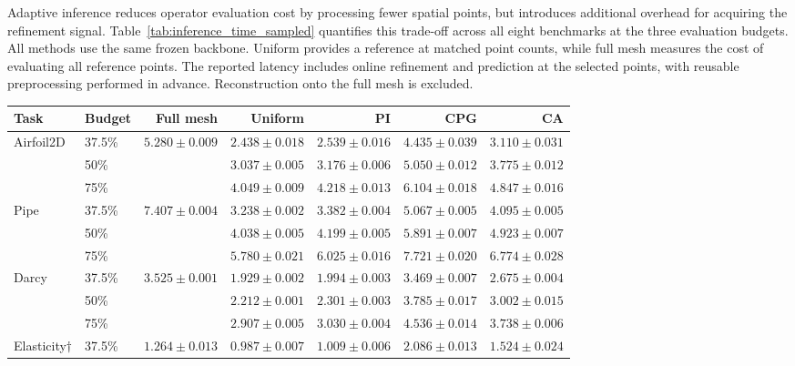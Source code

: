\documentclass{article}
\begin{document}
Adaptive inference reduces operator evaluation cost by processing fewer
spatial points, but introduces additional overhead for acquiring the
refinement signal. Table~\ref{tab:inference_time_sampled}
quantifies this trade-off across all eight benchmarks at the three
evaluation budgets. All methods use the same frozen backbone. Uniform
provides a reference at matched point counts, while full mesh measures the
cost of evaluating all reference points. The reported latency includes
online refinement and prediction at the selected points, with reusable
preprocessing performed in advance. Reconstruction onto the full mesh is
excluded.

\begin{table}[!ht]
\centering
\begingroup
\footnotesize
\setlength{\tabcolsep}{3.0pt}
\renewcommand{\arraystretch}{1.08}
\begin{tabular}{llrrrrr}
\toprule
Task & Budget & Full mesh & Uniform & PI & CPG & CA \\
\midrule
Airfoil2D & 37.5\% & $5.280\!\pm\!0.009$ & $2.438\!\pm\!0.018$ & $2.539\!\pm\!0.016$ & $4.435\!\pm\!0.039$ & $3.110\!\pm\!0.031$ \\
 & 50\% &  & $3.037\!\pm\!0.005$ & $3.176\!\pm\!0.006$ & $5.050\!\pm\!0.012$ & $3.775\!\pm\!0.012$ \\
 & 75\% &  & $4.049\!\pm\!0.009$ & $4.218\!\pm\!0.013$ & $6.104\!\pm\!0.018$ & $4.847\!\pm\!0.016$ \\
\addlinespace[2pt]
Pipe & 37.5\% & $7.407\!\pm\!0.004$ & $3.238\!\pm\!0.002$ & $3.382\!\pm\!0.004$ & $5.067\!\pm\!0.005$ & $4.095\!\pm\!0.005$ \\
 & 50\% &  & $4.038\!\pm\!0.005$ & $4.199\!\pm\!0.005$ & $5.891\!\pm\!0.007$ & $4.923\!\pm\!0.007$ \\
 & 75\% &  & $5.780\!\pm\!0.021$ & $6.025\!\pm\!0.016$ & $7.721\!\pm\!0.020$ & $6.774\!\pm\!0.028$ \\
\addlinespace[2pt]
Darcy & 37.5\% & $3.525\!\pm\!0.001$ & $1.929\!\pm\!0.002$ & $1.994\!\pm\!0.003$ & $3.469\!\pm\!0.007$ & $2.675\!\pm\!0.004$ \\
 & 50\% &  & $2.212\!\pm\!0.001$ & $2.301\!\pm\!0.003$ & $3.785\!\pm\!0.017$ & $3.002\!\pm\!0.015$ \\
 & 75\% &  & $2.907\!\pm\!0.005$ & $3.030\!\pm\!0.004$ & $4.536\!\pm\!0.014$ & $3.738\!\pm\!0.006$ \\
\addlinespace[2pt]
Elasticity$\dagger$ & 37.5\% & $1.264\!\pm\!0.013$ & $0.987\!\pm\!0.007$ & $1.009\!\pm\!0.006$ & $2.086\!\pm\!0.013$ & $1.524\!\pm\!0.024$ \\

\end{tabular}
\end{table}
\end{document}
